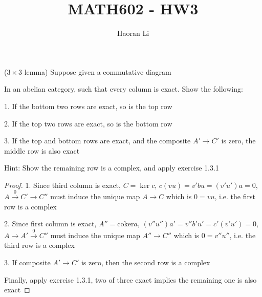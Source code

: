 \documentclass{article}
\title{MATH602 - HW3}
\author{Haoran Li}
\date{}
\newenvironment{exercise}[2][Exercise]{\begin{trivlist}
\item[\hskip \labelsep {\bfseries #1}\hskip \labelsep {\bfseries #2.}]}{\end{trivlist}}
\theoremstyle{definition}
\theoremstyle{remark}
\theoremstyle{definition}
\begin{document}
\sloppy %

\maketitle
\begin{exercise}{\textbf{1.3.2}}($3\times3$ lemma) Suppose given a commutative diagram
\begin{center}
\end{center}
In an abelian category, such that every column is exact. Show the following: \par
1. If the bottom two rows are exact, so is the top row \par
2. If the top two rows are exact, so is the bottom row \par
3. If the top and bottom rows are exact, and the composite $A'\to C'$ is zero, the middle row is also exact \par
Hint: Show the remaining row is a complex, and apply exercise 1.3.1
\end{exercise}

\begin{proof}
1. Since third column is exact, $C=\ker c$, $c(vu)=v'bu=(v'u')a=0$, $A\xrightarrow{0}C'\to C''$ must induce the unique map $A\to C$ which is $0=vu$, i.e. the first row is a complex \par
2. Since first column is exact, $A''=\mathrm{coker}a$, $(v''u'')a'=v''b'u'=c'(v'u')=0$, $A\to A'\xrightarrow{0}C''$ must induce the unique map $A''\to C''$ which is $0=v''u''$, i.e. the third row is a complex \par
3. If composite $A'\to C'$ is zero, then the second row is a complex \par
Finally, apply exercise 1.3.1, two of three exact implies the remaining one is also exact
\end{proof}
\end{document}
